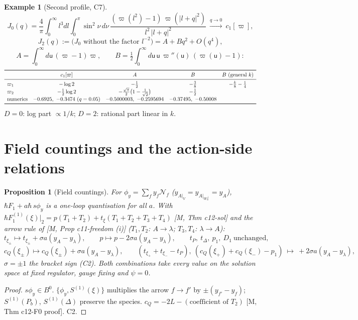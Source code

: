 \documentclass[10pt]{article}
\newtheorem{proposition}[theorem]{Proposition}
\theoremstyle{definition}
\newtheorem{example}[theorem]{Example}
\newcommand{\Wp}{W_{\mathbb R}^\perp}
\newcommand{\uu}{\mathsf u}
\begin{document}
\begin{example}[Second profile, C7]\label{ex:C7}
\[
J_0(q)=\frac4\pi\int_0^\infty l^3dl\int_0^\pi\sin^2\!\nu\,d\nu\,\frac{(\varpi(l^2)-1)\,\varpi(|l+q|^2)}{l^2\,|l+q|^2}\ \xrightarrow{q\to0}\ c_1[\varpi],
\]
\[
J_2(q):=\big(J_0\text{ without the factor }l^{-2}\big)=A+Bq^2+O(q^4),
\]
\[
A=\int_0^\infty d\uu\,(\varpi-1)\varpi,\qquad B=\tfrac12\int_0^\infty d\uu\,\uu\,\varpi''(\uu)\,(\varpi(\uu)-1):
\]
\[
\begin{array}{lcccc}
\toprule
&c_1[\varpi]&A&B&B\ \text{(general }k)\\\midrule
\varpi_1&-\log2&-\tfrac12&-\tfrac38&-\tfrac k8-\tfrac14\\
\varpi_2&-\tfrac12\log2&-\tfrac{\sqrt\pi}2\big(1-\tfrac1{\sqrt2}\big)&-\tfrac12&\\
\text{numerics}&-0.6925,\ -0.3474\ (q=0.05)&-0.5000003,\ -0.2595694&-0.37495,\ -0.50008&\\
\bottomrule
\end{array}
\]
$D=0$: log part $\propto1/k$; $D=2$: rational part linear in $k$.
\end{example}

\section{Field countings and the action-side relations}

\begin{proposition}[Field countings]\label{prop:count}
For $\phi_y=\sum_fy_f\mathcal N_f$ ($y_{A|_V}=y_{A|_{\Wp}}=y_A$), $\hbar F_1+a\hbar\,s\phi_y$ is a one-loop quantisation for all $a$. With $\hbar F_1^{(1)}(\xi)|_2=p(T_1+T_2)+t_\xi(T_1+T_2+T_3+T_4)$ [M, Thm c12-sol] and the arrow rule of [M, Prop c11-freedom (i)] ($T_1,T_2$: $A\to\lambda$; $T_3,T_4$: $\lambda\to A$):
\[
t_{\xi_\pm}\mapsto t_{\xi_\pm}+\sigma a(y_A-y_\lambda),\qquad p\mapsto p-2\sigma a(y_A-y_\lambda),\qquad t_P,\ t_\Delta,\ p_1,\ D_1\ \text{unchanged},
\]
\[
c_Q(\xi_\pm)\mapsto c_Q(\xi_\pm)+\sigma a(y_A-y_\lambda),\qquad (t_{\xi_+}+t_{\xi_-}-t_P),\ (c_Q(\xi_+)+c_Q(\xi_-)-p_1)\ \mapsto\ +2\sigma a(y_A-y_\lambda),
\]
$\sigma=\pm1$ the bracket sign (C2). Both combinations take every value on the solution space at fixed regulator, gauge fixing and $\psi=0$.
\end{proposition}
\begin{proof}
$s\phi_y\in B^0$. $\{\phi_y,S^{(1)}(\xi)\}$ multiplies the arrow $f\to f'$ by $\pm(y_{f'}-y_f)$; $S^{(1)}(P_b)$, $S^{(1)}(\Delta)$ preserve the species. $c_Q=-2L-(\text{coefficient of }T_2)$ [M, Thm c12-F0 proof]. C2.
\end{proof}
\end{document}
